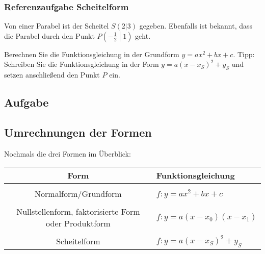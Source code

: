\subsubsection{Referenzaufgabe Scheitelform}
Von einer Parabel ist der Scheitel $S(2|3)$ gegeben. Ebenfalls ist bekannt, dass die Parabel durch den Punkt $P\left(-\frac{1}{2}\middle|1\right)$ geht.

  Berechnen Sie die Funktionsgleichung in der Grundform $y = ax^2 + bx + c$. Tipp:
  Schreiben Sie die Funktionsgleichung in der Form $y=a(x - x_S)^2 +  y_S$ und setzen anschließend den Punkt $P$ ein.


  \subsection*{Aufgabe}

\newpage


\subsection{Umrechnungen der Formen}

Nochmals die drei Formen im Überblick:


\begin{tabular}{c|l}
  Form & Funktionsgleichung\\
  \hline\\
  Normalform/Grundform & $f: y= ax^2 + bx + c$\\
  \hline\\
  Nullstellenform, faktorisierte Form oder Produktform & $f: y=a(x-x_0)(x-x_1)$\\
  \hline\\
  Scheitelform & $f: y=a(x-x_S)^2+y_S$\\
  \hline%
\end{tabular}


